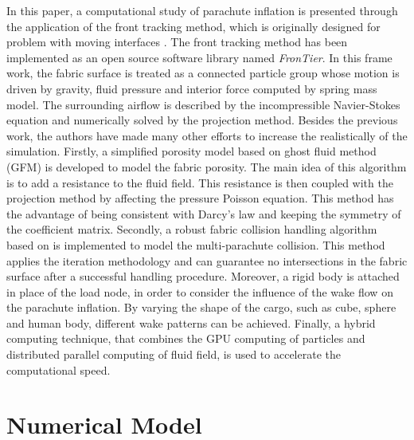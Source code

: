 In this paper, a computational study of parachute inflation is presented
through the application of the front tracking method, which is originally
designed for problem with moving interfaces \cite{Glimm1998, Tryggvason2001,
Hu2015}. The front tracking method has been implemented as an open source
software library named \textit{FronTier}. In this frame work, the fabric
surface is treated as a connected particle group whose motion is driven by
gravity, fluid pressure and interior force computed by spring mass model. The
surrounding airflow is described by the incompressible Navier-Stokes equation
and numerically solved by the projection method.  Besides the previous work,
the authors have made many other efforts to increase the realistically of the
simulation. Firstly, a simplified porosity model based on ghost fluid method
(GFM) \cite{Kang2000} is developed to model the fabric porosity. The main idea
of this algorithm is to add a resistance to the fluid field. This resistance is
then coupled with the projection method by affecting the pressure Poisson
equation. This method has the advantage of being consistent with Darcy's law
and keeping the symmetry of the coefficient matrix. Secondly, a robust fabric
collision handling algorithm based on \cite{Bridson2005} is implemented to
model the multi-parachute collision. This method applies the iteration
methodology and can guarantee no intersections in the fabric surface after a
successful handling procedure. Moreover, a rigid body is attached in place of
the load node, in order to consider the influence of the wake flow on the
parachute inflation. By varying the shape of the cargo, such as cube, sphere
and human body, different wake patterns can be achieved. Finally, a hybrid
computing technique, that combines the GPU computing of particles and
distributed parallel computing of fluid field, is used to accelerate the
computational speed.

\section{Numerical Model}
